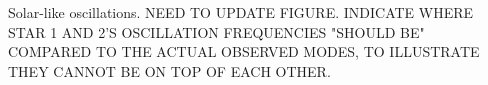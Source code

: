 \label{fig:seismo} Solar-like oscillations. NEED TO UPDATE FIGURE. INDICATE WHERE STAR 1 AND 2'S OSCILLATION FREQUENCIES "SHOULD BE" COMPARED TO THE ACTUAL OBSERVED MODES, TO ILLUSTRATE THEY CANNOT BE ON TOP OF EACH OTHER.
    
    
    
    